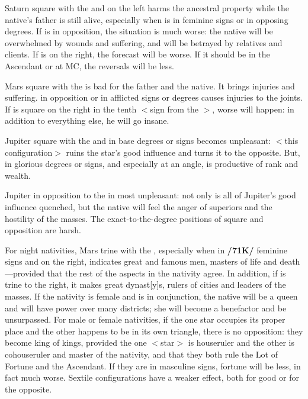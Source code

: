 Saturn \marginnote{\Saturn \Square \Sun} square with the \Sun\xspace and on the left harms the ancestral property while the native’s father is still alive, especially when \Saturn\xspace is in feminine signs or in opposing degrees. If \Saturn\xspace is in opposition, the situation is much worse: the native will be overwhelmed by wounds and suffering, and will be betrayed by relatives and clients. If \Saturn\xspace is on the right, the forecast will be worse. If it should be in the Ascendant or at MC, the reversals will be less.

Mars \marginnote{\Mars \Square \Sun} square with the \Sun\xspace is bad for the father and the native. It brings injuries and suffering. \Mars\xspace in opposition or in afflicted signs or degrees causes injuries to the joints. If \Mars\xspace is square on the right in the tenth $<$sign from the \Sun$>$, worse will happen: in addition to everything else, he will go insane.

Jupiter \marginnote{\Jupiter \Square \Sun} square with the \Sun\xspace and in base degrees or signs becomes unpleasant: $<$this configuration$>$ ruins the star’s good influence and turns it to the opposite. But, \Jupiter\xspace in glorious degrees or signs, and especially at an angle, is productive of rank and wealth. 

Jupiter \marginnote{\Jupiter \Opposition \Sun} in opposition to the \Sun\xspace in most unpleasant: not only is all of Jupiter’s good influence quenched, but the native will feel the anger of superiors and the hostility of the masses. The \mndl exact-to-the-degree positions of square and opposition are
harsh.

For night nativities, Mars \marginnote{\Mars \Trine \Sun} trine with the \Sun, especially when in \textbf{/71K/} feminine signs and on the right, indicates great and famous men, masters of life and death—provided that the rest of the aspects in the nativity agree. In addition, if \Jupiter\xspace is trine to the right, it makes great dynast[y]s, rulers of cities and leaders of the masses. If the nativity is female and \Venus\xspace is in conjunction, the native will be a queen and will have power over many districts; she will become a benefactor and be unsurpassed. For male or female
nativities, if the one star occupies its proper place and the other happens to be in its own triangle, there is
no opposition: they become king of kings, provided the one $<$star$>$ is houseruler and the other is cohouseruler
and master of the nativity, and that they both rule the Lot of Fortune and the Ascendant. If they are in masculine signs, fortune will be less, in fact much worse. Sextile \mndl configurations have a weaker effect, both for good or for the opposite.

